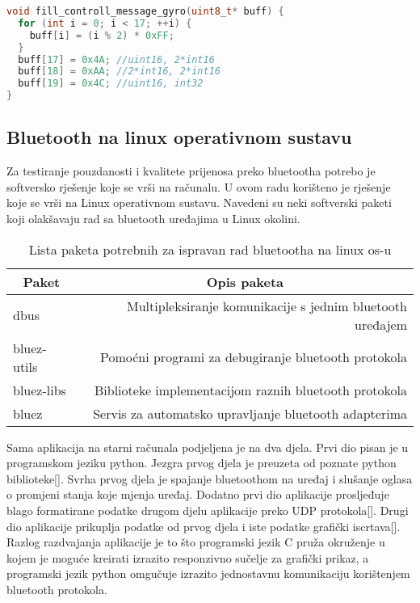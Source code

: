 \documentclass[times, utf8, diplomski]{diplomski}
\begin{document}
\begin{lstlisting}[language=c++, caption={Funkcija koja puni kontrolnu poruku za žiroskopske podatke}, label={codecontroll}]
void fill_controll_message_gyro(uint8_t* buff) {
  for (int i = 0; i < 17; ++i) {
    buff[i] = (i % 2) * 0xFF;
  }
  buff[17] = 0x4A; //uint16, 2*int16
  buff[18] = 0xAA; //2*int16, 2*int16
  buff[19] = 0x4C; //uint16, int32
}
\end{lstlisting}

\subsection{Bluetooth na linux operativnom sustavu}
Za testiranje pouzdanosti i kvalitete prijenosa preko bluetootha potrebo je softversko rješenje koje se vrši na računalu. U ovom radu korišteno je rješenje koje se vrši na Linux operativnom sustavu. Navedeni su neki softverski paketi koji olakšavaju rad sa bluetooth uređajima u Linux okolini.

\begin{table}[h]
  \begin{center}
    \begin{tabular}[c]{l|r}
      \multicolumn{1}{c|}{\textbf{Paket}} & 
      \multicolumn{1}{c}{\textbf{Opis paketa}} \\
      \hline
      dbus & Multipleksiranje komunikacije s jednim bluetooth uređajem \\
      bluez-utils & Pomoćni programi za debugiranje bluetooth protokola \\
      bluez-libs & Biblioteke implementacijom raznih bluetooth protokola \\
      bluez & Servis za automatsko upravljanje bluetooth adapterima \\
      \hline
    \end{tabular}
  \caption{Lista paketa potrebnih za ispravan rad bluetootha na linux os-u}
  \end{center}
\end{table}

Sama aplikacija na starni računala podjeljena je na dva djela. Prvi dio pisan je u programskom jeziku python. Jezgra prvog djela je preuzeta od poznate python biblioteke[\cite{ble-serial}]. Svrha prvog djela je spajanje bluetoothom na uređaj i slušanje oglasa o promjeni stanja koje mjenja uređaj. Dodatno prvi dio aplikacije prosljeđuje blago formatirane podatke drugom djelu aplikacije preko UDP protokola[\cite{firstPart}]. Drugi dio aplikacije prikuplja podatke od prvog djela i iste podatke grafički iscrtava[\cite{secondPart}]. Razlog razdvajanja aplikacije je to što programski jezik C pruža okruženje u kojem je moguće kreirati izrazito responzivno sučelje za grafički prikaz, a programski jezik python omgučuje izrazito jednostavnu komunikaciju korištenjem bluetooth protokola.
\end{document}
